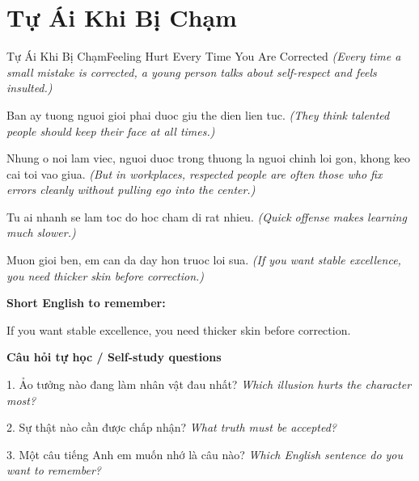\section{Tự Ái Khi Bị Chạm}
\begin{truyen}{Tự Ái Khi Bị Chạm}{Feeling Hurt Every Time You Are Corrected}
\textit{(Every time a small mistake is corrected, a young person talks about self-respect and feels insulted.)}

Ban ay tuong nguoi gioi phai duoc giu the dien lien tuc.
\textit{(They think talented people should keep their face at all times.)}

Nhung o noi lam viec, nguoi duoc trong thuong la nguoi chinh loi gon, khong keo cai toi vao giua.
\textit{(But in workplaces, respected people are often those who fix errors cleanly without pulling ego into the center.)}

Tu ai nhanh se lam toc do hoc cham di rat nhieu.
\textit{(Quick offense makes learning much slower.)}

\end{truyen}

\begin{baihoc}
Muon gioi ben, em can da day hon truoc loi sua.
\textit{(If you want stable excellence, you need thicker skin before correction.)}
\end{baihoc}

\begin{ghinhoanh}
\textbf{Short English to remember:}

If you want stable excellence, you need thicker skin before correction.

\end{ghinhoanh}

\begin{tuhocnhanh}
\textbf{Câu hỏi tự học / Self-study questions}

1. Ảo tưởng nào đang làm nhân vật đau nhất? \textit{Which illusion hurts the character most?}

2. Sự thật nào cần được chấp nhận? \textit{What truth must be accepted?}

3. Một câu tiếng Anh em muốn nhớ là câu nào? \textit{Which English sentence do you want to remember?}
\end{tuhocnhanh}
